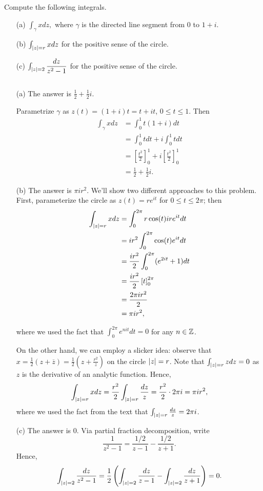 \begin{exercise}
    Compute the following integrals.
    \begin{enumerate}
    \item[(a)] $\int_{\gamma} x dz,$ where $\gamma$ is the directed line segment from $0$ to $1+i$.
    \item[(b)] $\int_{\lvert z \rvert=r} x dz$ for the positive sense of the circle.
    \item[(c)] $\int_{\lvert z \rvert=2}\dfrac{dz}{z^2-1}$ for the positive sense of the circle.
    \end{enumerate}

    \begin{sol}
    $ $
    \begin{enumerate}
    \item[(a)] The answer is $\boxed{\frac{1}{2}+\frac{1}{2}i}$.
    
    Parametrize $\gamma$ as $z(t)=(1+i)t=t+it$, $0 \le t \le 1$. Then \begin{align*}
    \int_{\gamma} x dz &=\int_{0}^{1} t(1+i)dt \\
    &=\int_{0}^{1}t dt+i\int_{0}^{1}t dt \\
    &=\left[\frac{t^2}{2}\right]_{0}^{1}+i\left[\frac{t^2}{2}\right]_{0}^{1} \\
    &=\frac{1}{2}+\frac{1}{2}i.
    \end{align*}
    \item[(b)] The answer is $\boxed{\pi i r^2}$.
    We'll show two different approaches to this problem. First, parameterize the circle as $z(t)=re^{it}$ for $0 \le t \le 2\pi$; then \begin{align*}
    \int_{\lvert z \rvert=r} x dz &=\int_{0}^{2\pi} r\cos(t) i r e^{it} dt \\
    &=i r^2 \int_{0}^{2\pi} \cos(t)e^{it} dt \\
    &=\dfrac{ir^2}{2} \int_{0}^{2\pi}(e^{2it}+1)dt \\
    &=\dfrac{ir^2}{2}\left[t\right]_{0}^{2\pi} \\
    &=\dfrac{2\pi ir^2}{2} \\
    &=\pi i r^2,
    \end{align*}

    where we used the fact that $\int_{0}^{2\pi} e^{nit} dt=0$ for any $n \in \mathbb Z$.

    On the other hand, we can employ a slicker idea: observe that $x=\frac{1}{2}\left(z+\overline{z}\right)=\frac{1}{2}\left(z+\frac{r^2}{z}\right)$ on the circle $\lvert z \rvert=r$. Note that $\int_{\lvert z \rvert=r}zdz=0$ as $z$ is the derivative of an analytic function. Hence, $$\int_{\lvert z \rvert=r} x dz=\dfrac{r^2}{2}\int_{\lvert z \rvert=r}\dfrac{dz}{z}=\dfrac{r^2}{2}\cdot 2\pi i=\pi i r^2,$$ where we used the fact from the text that $\int_{\lvert z \rvert=r} \frac{dz}{z}=2\pi i$.
    \item[(c)] The answer is $\boxed{0}$. Via partial fraction decomposition, write $$\dfrac{1}{z^2-1}=\dfrac{1/2}{z-1}-\dfrac{1/2}{z+1}.$$ Hence, $$\int_{\lvert z \rvert=2}\dfrac{dz}{z^2-1}=\dfrac{1}{2}\left(\int_{\lvert z \rvert=2}\dfrac{dz}{z-1}-\int_{\lvert z \rvert=2}\dfrac{dz}{z+1}\right)=0.$$
    \end{enumerate}
    \end{sol}
\end{exercise}

